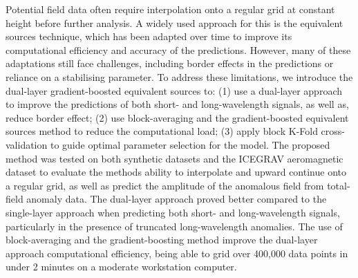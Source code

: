 Potential field data often require interpolation onto a regular grid at constant height before further analysis. A widely used approach for this is the equivalent sources technique, which has been adapted over time to improve its computational efficiency and accuracy of the predictions. However, many of these adaptations still face challenges, including border effects in the predictions or reliance on a stabilising parameter. To address these limitations, we introduce the dual-layer gradient-boosted equivalent sources to: (1) use a dual-layer approach to improve the predictions of both short- and long-wavelength signals, as well as, reduce border effect; (2) use block-averaging and the gradient-boosted equivalent sources method to reduce the computational load; (3) apply block K-Fold cross-validation to guide optimal parameter selection for the model. The proposed method was tested on both synthetic datasets and the ICEGRAV aeromagnetic dataset to evaluate the methods ability to interpolate and upward continue onto a regular grid, as well as predict the amplitude of the anomalous field from total-field anomaly data. The dual-layer approach proved better compared to the single-layer approach when predicting both short- and long-wavelength signals, particularly in the presence of truncated long-wavelength anomalies. The use of block-averaging and the gradient-boosting method improve the dual-layer approach computational efficiency, being able to grid over 400,000 data points in under 2 minutes on a moderate workstation computer.